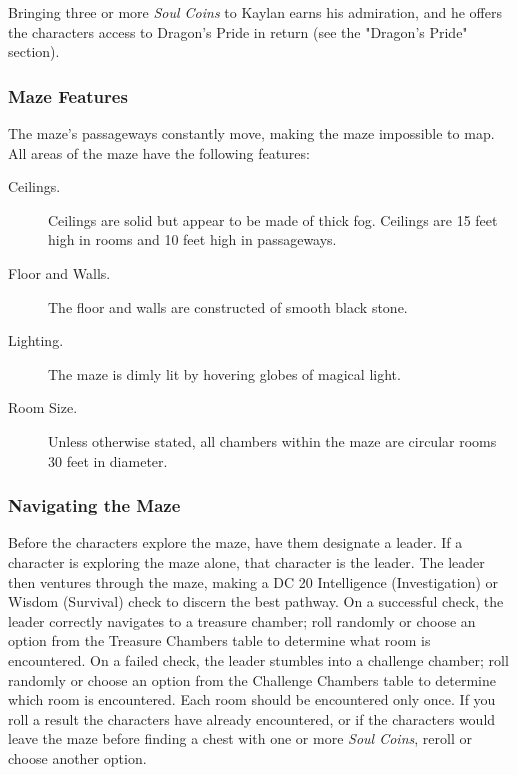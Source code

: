 \documentclass[10pt,a4paper,twoside,bg=print,twocolumn,openany,nodeprecatedcode]{dndbook}
\begin{document}
Bringing three or more \textit{Soul Coins} to Kaylan earns his admiration, and he offers the characters access to Dragon's Pride in return (see the "Dragon's Pride" section).

\subsubsection{Maze Features}
The maze's passageways constantly move, making the maze impossible to map. All areas of the maze have the following features:


\begin{description}
\item[Ceilings.]
Ceilings are solid but appear to be made of thick fog. Ceilings are 15 feet high in rooms and 10 feet high in passageways.
\item[Floor and Walls.]
The floor and walls are constructed of smooth black stone.
\item[Lighting.]
The maze is dimly lit by hovering globes of magical light.
\item[Room Size.]
Unless otherwise stated, all chambers within the maze are circular rooms 30 feet in diameter.
\end{description}

\subsubsection{Navigating the Maze}
Before the characters explore the maze, have them designate a leader. If a character is exploring the maze alone, that character is the leader. The leader then ventures through the maze, making a DC 20 Intelligence (Investigation) or Wisdom (Survival) check to discern the best pathway. On a successful check, the leader correctly navigates to a treasure chamber; roll randomly or choose an option from the Treasure Chambers table to determine what room is encountered. On a failed check, the leader stumbles into a challenge chamber; roll randomly or choose an option from the Challenge Chambers table to determine which room is encountered. Each room should be encountered only once. If you roll a result the characters have already encountered, or if the characters would leave the maze before finding a chest with one or more \textit{Soul Coins}, reroll or choose another option.
\end{document}

